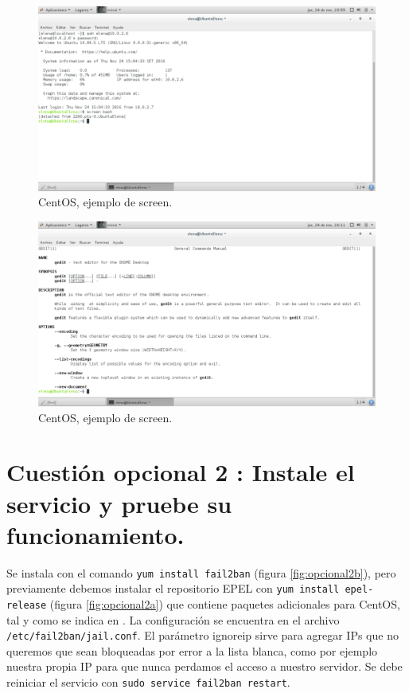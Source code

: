\begin{figure}[H] 
	\centering
	\includegraphics[width=15cm]{./img/opcional1c.png} 	
	\caption{CentOS, ejemplo de screen.} \label{fig:opcional1c}
\end{figure}

\begin{figure}[H] 
	\centering
	\includegraphics[width=15cm]{./img/opcional1d.png} 	
	\caption{CentOS, ejemplo de screen.} \label{fig:opcional1d}
\end{figure}



\section{Cuestión opcional 2 : Instale el servicio y pruebe su funcionamiento.}
Se instala con el comando \texttt{yum install fail2ban} (figura \ref{fig:opcional2b}), pero previamente debemos instalar el repositorio EPEL con \texttt{yum install epel-release} (figura \ref{fig:opcional2a}) que contiene paquetes adicionales para CentOS, tal y como se indica en \cite{fail2ban}. La configuración se encuentra en el archivo \texttt{/etc/fail2ban/jail.conf}. El parámetro ignoreip sirve para agregar IPs que no queremos que sean bloqueadas por error a la lista blanca, como por ejemplo nuestra propia IP para que nunca perdamos el acceso a nuestro servidor. Se debe reiniciar el servicio con \texttt{sudo service fail2ban restart}.

